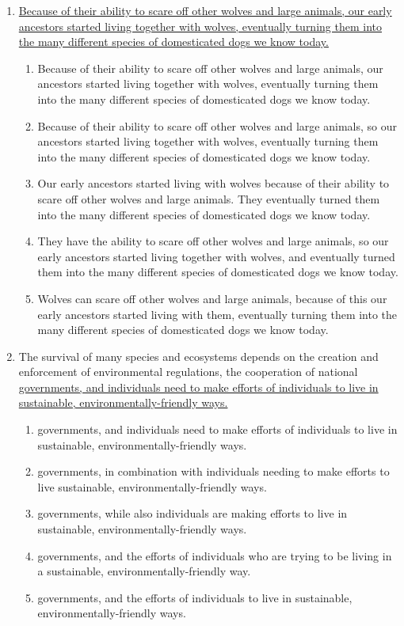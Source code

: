 \begin{enumerate}
\bigskip
\item \ul{Because of their ability to scare off other wolves and large animals, our early ancestors started living together with wolves, eventually turning them into the many different species of domesticated dogs we know today.}

\begin{enumerate}[label=(\Alph*)]
\item Because of their ability to scare off other wolves and large animals, our ancestors started living together with wolves, eventually turning them into the many different species of domesticated dogs we know today.
\item Because of their ability to scare off other wolves and large animals, so our ancestors started living together with wolves, eventually turning them into the many different species of domesticated dogs we know today.
\item Our early ancestors started living with wolves because of their ability to scare off other wolves and large animals.  They eventually turned them into the many different species of domesticated dogs we know today.
\item They have the ability to scare off other wolves and large animals, so our early ancestors started living together with wolves, and eventually turned them into the many different species of domesticated dogs we know today.
\item Wolves can scare off other wolves and large animals, because of this our early ancestors started living with  them, eventually turning them into the many different species of domesticated dogs we know today.
\end{enumerate}

\newpage
\item The survival of many species and ecosystems depends on the creation and enforcement of environmental regulations, the cooperation of national \ul{governments, and individuals need to make efforts of individuals to live in sustainable, environmentally-friendly ways.}

\begin{enumerate}[label=(\Alph*)]
\item governments, and individuals need to make efforts of individuals to live in sustainable, environmentally-friendly ways.   
\item governments, in combination with individuals needing to make efforts to live sustainable, environmentally-friendly ways.
\item governments, while also individuals are making efforts to live in sustainable, environmentally-friendly ways.
\item governments, and the efforts of individuals who are trying to be living in a sustainable, environmentally-friendly way.
\item governments, and the efforts of individuals to live in sustainable, environmentally-friendly ways.   
\end{enumerate}


\end{enumerate}
